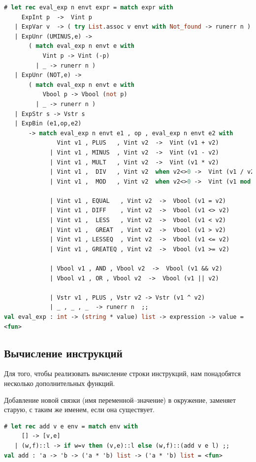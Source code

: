 \begin{lstlisting}[language=OCaml]
# let rec eval_exp n envt expr = match expr with 
     ExpInt p  ->  Vint p
   | ExpVar v  -> ( try List.assoc v envt with Not_found -> runerr n )
   | ExpUnr (UMINUS,e) ->  
       ( match eval_exp n envt e with 
           Vint p -> Vint (-p) 
         | _ -> runerr n )
   | ExpUnr (NOT,e) ->  
       ( match eval_exp n envt e with 
           Vbool p -> Vbool (not p) 
         | _ -> runerr n )
   | ExpStr s -> Vstr s  
   | ExpBin (e1,op,e2) 
       -> match eval_exp n envt e1 , op , eval_exp n envt e2 with
               Vint v1 , PLUS   , Vint v2  ->  Vint (v1 + v2) 
             | Vint v1 , MINUS  , Vint v2  ->  Vint (v1 - v2) 
             | Vint v1 , MULT   , Vint v2  ->  Vint (v1 * v2) 
             | Vint v1 ,  DIV   , Vint v2  when v2<>0 ->  Vint (v1 / v2) 
             | Vint v1 ,  MOD   , Vint v2  when v2<>0 ->  Vint (v1 mod v2) 
 
             | Vint v1 , EQUAL   , Vint v2  ->  Vbool (v1 = v2) 
             | Vint v1 , DIFF    , Vint v2  ->  Vbool (v1 <> v2) 
             | Vint v1 ,  LESS   , Vint v2  ->  Vbool (v1 < v2) 
             | Vint v1 ,  GREAT  , Vint v2  ->  Vbool (v1 > v2) 
             | Vint v1 , LESSEQ  , Vint v2  ->  Vbool (v1 <= v2) 
             | Vint v1 , GREATEQ , Vint v2  ->  Vbool (v1 >= v2) 
 
             | Vbool v1 , AND , Vbool v2  ->  Vbool (v1 && v2) 
             | Vbool v1 , OR , Vbool v2  ->  Vbool (v1 || v2) 
 
             | Vstr v1 , PLUS , Vstr v2 -> Vstr (v1 ^ v2) 
             | _ , _ , _  -> runerr n  ;;
val eval_exp : int -> (string * value) list -> expression -> value = 
<fun>
\end{lstlisting}

\subsection{Вычисление инструкций}
\label{subsubsec:command_evaluation}

Для того, чтобы реализовать вычисление строки инструкций, нам понадобятся 
несколько дополнительных функций.

Добавление новой связки (имя переменной--значение) в окружение, заменяет 
старую, с таким же именем, если она существует.

\begin{lstlisting}[language=OCaml]
# let rec add v e env = match env with 
     [] -> [v,e]
   | (w,f)::l -> if w=v then (v,e)::l else (w,f)::(add v e l) ;;
val add : 'a -> 'b -> ('a * 'b) list -> ('a * 'b) list = <fun>
\end{lstlisting}

